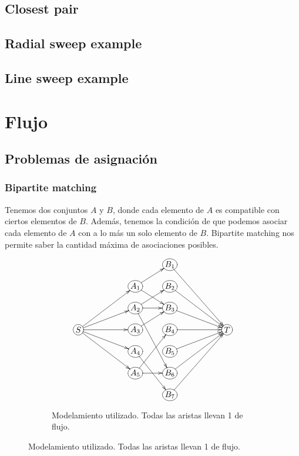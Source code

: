 \documentclass[oneside]{book}
\begin{document}
	\section{Closest pair}
	
	\section{Radial sweep example}
	
	\section{Line sweep example}
	
	\chapter{Flujo}
	\section{Problemas de asignaci\'on}
	\subsection{Bipartite matching}
	Tenemos dos conjuntos $A$ y $B$, donde cada elemento de $A$ es compatible con ciertos elementos de $B$. Adem\'as, tenemos la condici\'on de que podemos asociar cada elemento de $A$ con a lo m\'as un solo elemento de $B$. Bipartite matching nos permite saber la cantidad m\'axima de asociaciones posibles.
\begin{figure}[h]
\centering
\begin{subfigure}{.5\textwidth}
\begin{displaymath}
\xymatrix@R-1pc{
&&&*+[o][F-]{B_1} \ar[dddrr] \\
&&*+[o][F-]{A_1} \ar[ur] \ar[dr]
&*+[o][F-]{B_2} \ar[ddrr] \\
&&*+[o][F-]{A_2} \ar[r] \ar[dddr] \ar[ur]
&*+[o][F-]{B_3} \ar[drr] \\
*+[o][F-]{S} \ar[rruu] \ar[rru] \ar[rr] \ar[rrd] \ar[rrdd]
&&*+[o][F-]{A_3} \ar[ur]
&*+[o][F-]{B_4} \ar[rr]
&&*+[o][F-]{T} \\
&&*+[o][F-]{A_4} \ar[ddr]
&*+[o][F-]{B_5} \ar[urr] \\
&&*+[o][F-]{A_5} \ar[r] \ar[uur]
&*+[o][F-]{B_6} \ar[uurr] \\
&&&*+[o][F-]{B_7} \ar[uuurr]
}
\end{displaymath}
\caption*{Modelamiento utilizado. Todas las aristas llevan 1 de flujo.}
\end{subfigure}

\end{figure}
\end{document}
